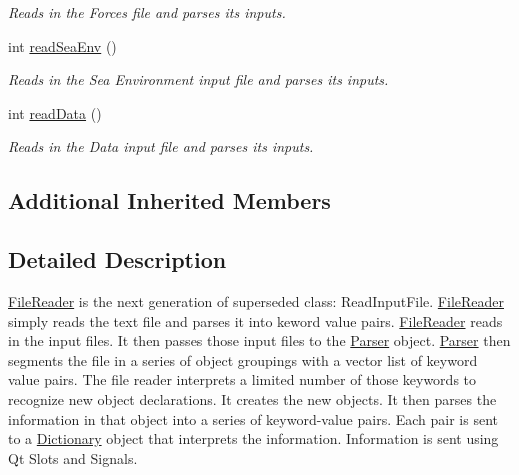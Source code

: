 \begin{DoxyCompactItemize}
\begin{DoxyCompactList}\small\item\em Reads in the Forces file and parses its inputs. \end{DoxyCompactList}\item 
int \hyperlink{classosea_1_1_file_reader_a1f8a6bd4b5c53f80cc94d64d6dd1f2da}{read\-Sea\-Env} ()
\begin{DoxyCompactList}\small\item\em Reads in the Sea Environment input file and parses its inputs. \end{DoxyCompactList}\item 
int \hyperlink{classosea_1_1_file_reader_a814f8b06adcc190d4042509797eef6d2}{read\-Data} ()
\begin{DoxyCompactList}\small\item\em Reads in the Data input file and parses its inputs. \end{DoxyCompactList}\end{DoxyCompactItemize}
\subsection*{Additional Inherited Members}


\subsection{Detailed Description}
\hyperlink{classosea_1_1_file_reader}{File\-Reader} is the next generation of superseded class\-: Read\-Input\-File. \hyperlink{classosea_1_1_file_reader}{File\-Reader} simply reads the text file and parses it into keword value pairs. \hyperlink{classosea_1_1_file_reader}{File\-Reader} reads in the input files. It then passes those input files to the \hyperlink{classosea_1_1_parser}{Parser} object. \hyperlink{classosea_1_1_parser}{Parser} then segments the file in a series of object groupings with a vector list of keyword value pairs. The file reader interprets a limited number of those keywords to recognize new object declarations. It creates the new objects. It then parses the information in that object into a series of keyword-\/value pairs. Each pair is sent to a \hyperlink{classosea_1_1_dictionary}{Dictionary} object that interprets the information. Information is sent using Qt Slots and Signals.

